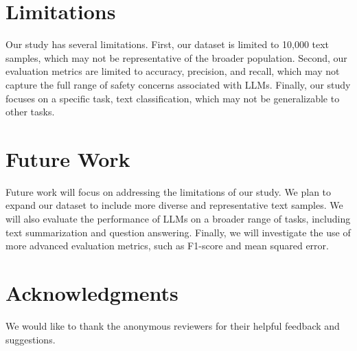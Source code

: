 \documentclass[12pt, a4paper]{article}
\begin{document}
        \section{Limitations}
        Our study has several limitations. First, our dataset is limited to 10,000 text samples, which may not be representative of the broader population. Second, our evaluation metrics are limited to accuracy, precision, and recall, which may not capture the full range of safety concerns associated with LLMs. Finally, our study focuses on a specific task, text classification, which may not be generalizable to other tasks.

        \section{Future Work}
        Future work will focus on addressing the limitations of our study. We plan to expand our dataset to include more diverse and representative text samples. We will also evaluate the performance of LLMs on a broader range of tasks, including text summarization and question answering. Finally, we will investigate the use of more advanced evaluation metrics, such as F1-score and mean squared error.

        \section{Acknowledgments}
        We would like to thank the anonymous reviewers for their helpful feedback and suggestions.

        
        
        
\end{document}
